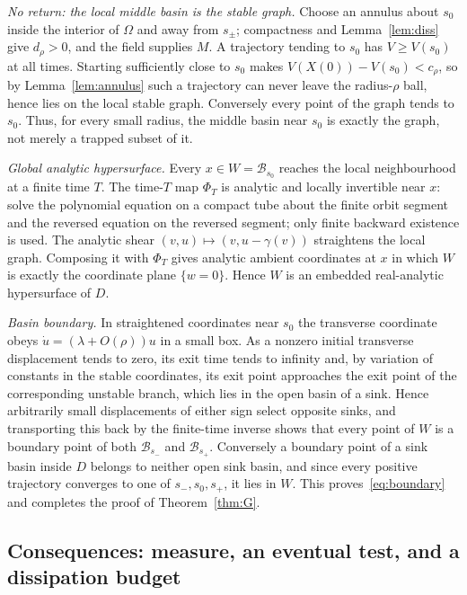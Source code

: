\documentclass[11pt,a4paper]{article}
\theoremstyle{plain}
\theoremstyle{definition}
\theoremstyle{remark}
\newcommand{\B}{\mathcal{B}}
\begin{document}
\emph{No return: the local middle basin is the stable graph.} Choose an annulus about $s_0$ inside the interior of $\Omega$ and away from $s_\pm$; compactness and Lemma~\ref{lem:diss} give $d_\rho>0$, and the field supplies $M$. A trajectory tending to $s_0$ has $V\ge V(s_0)$ at all times. Starting sufficiently close to $s_0$ makes $V(X(0))-V(s_0)<c_\rho$, so by Lemma~\ref{lem:annulus} such a trajectory can never leave the radius-$\rho$ ball, hence lies on the local stable graph. Conversely every point of the graph tends to $s_0$. Thus, for every small radius, the middle basin near $s_0$ is exactly the graph, not merely a trapped subset of it.

\emph{Global analytic hypersurface.} Every $x\in W=\B_{s_0}$ reaches the local neighbourhood at a finite time $T$. The time-$T$ map $\Phi_T$ is analytic and locally invertible near $x$: solve the polynomial equation on a compact tube about the finite orbit segment and the reversed equation on the reversed segment; only finite backward existence is used. The analytic shear $(v,u)\mapsto(v,u-\gamma(v))$ straightens the local graph. Composing it with $\Phi_T$ gives analytic ambient coordinates at $x$ in which $W$ is exactly the coordinate plane $\{w=0\}$. Hence $W$ is an embedded real-analytic hypersurface of $D$.

\emph{Basin boundary.} In straightened coordinates near $s_0$ the transverse coordinate obeys $\dot u=(\lambda+O(\rho))u$ in a small box. As a nonzero initial transverse displacement tends to zero, its exit time tends to infinity and, by variation of constants in the stable coordinates, its exit point approaches the exit point of the corresponding unstable branch, which lies in the open basin of a sink. Hence arbitrarily small displacements of either sign select opposite sinks, and transporting this back by the finite-time inverse shows that every point of $W$ is a boundary point of both $\B_{s_-}$ and $\B_{s_+}$. Conversely a boundary point of a sink basin inside $D$ belongs to neither open sink basin, and since every positive trajectory converges to one of $s_-,s_0,s_+$, it lies in $W$. This proves~\eqref{eq:boundary} and completes the proof of Theorem~\ref{thm:G}.

\subsection{Consequences: measure, an eventual test, and a dissipation budget}\label{sec:consequences}
\end{document}
